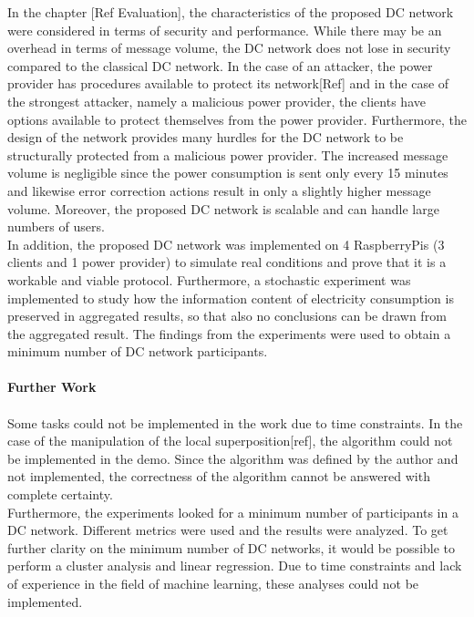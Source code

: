In the chapter [Ref Evaluation], the characteristics of the proposed DC network were considered in terms of security and performance. While there may be an overhead in terms of message volume, the DC network does not lose in security compared to the classical DC network. In the case of an attacker, the power provider has procedures available to protect its network[Ref] and in the case of the strongest attacker, namely a malicious power provider, the clients have options available to protect themselves from the power provider. Furthermore, the design of the network provides many hurdles for the DC network to be structurally protected from a malicious power provider. The increased message volume is negligible since the power consumption is sent only every 15 minutes and likewise error correction actions result in only a slightly higher message volume. Moreover, the proposed DC network is scalable and can handle large numbers of users.\\
In addition, the proposed DC network was implemented on 4 RaspberryPis (3 clients and 1 power provider) to simulate real conditions and prove that it is a workable and viable protocol. Furthermore, a stochastic experiment was implemented to study how the information content of electricity consumption is preserved in aggregated results, so that also no conclusions can be drawn from the aggregated result. The findings from the experiments were used to obtain a minimum number of DC network participants. \\
\\
\textbf{Further Work}
\\
\\
Some tasks could not be implemented in the work due to time constraints. In the case of the manipulation of the local superposition[ref], the algorithm could not be implemented in the demo. Since the algorithm was defined by the author and not implemented, the correctness of the algorithm cannot be answered with complete certainty. \\
Furthermore, the experiments looked for a minimum number of participants in a DC network. Different metrics were used and the results were analyzed. To get further clarity on the minimum number of DC networks, it would be possible to perform a cluster analysis and linear regression. Due to time constraints and lack of experience in the field of machine learning, these analyses could not be implemented.





\cleardoublepage

